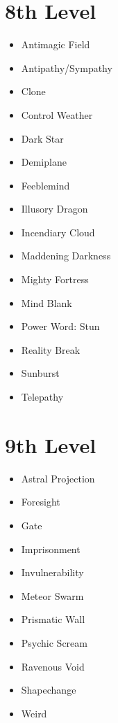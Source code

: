 \documentclass[a4paper,10pt,twoside,twocolumn, bg=print]{dndbook} %
\begin{document}
		\section{8th Level}
			\begin{itemize}
				\item Antimagic Field
				\item Antipathy/Sympathy
				\item Clone
				\item Control Weather
				\item Dark Star
				\item Demiplane
				\item Feeblemind
				\item Illusory Dragon
				\item Incendiary Cloud
				\item Maddening Darkness
				\item Mighty Fortress
				\item Mind Blank
				\item Power Word: Stun
				\item Reality Break
				\item Sunburst
				\item Telepathy
			\end{itemize}
		\section{9th Level}
			\begin{itemize}
				\item Astral Projection
				\item Foresight
				\item Gate
				\item Imprisonment
				\item Invulnerability
				\item Meteor Swarm
				\item Prismatic Wall
				\item Psychic Scream
				\item Ravenous Void
				\item Shapechange
				\item Weird
			\end{itemize}
\end{document}
